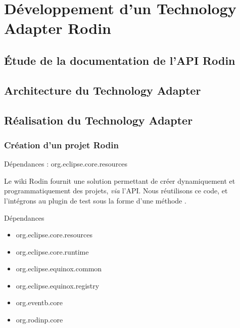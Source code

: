 \section{Développement d'un Technology Adapter Rodin}

\subsection{Étude de la documentation de l'API Rodin}

\subsection{Architecture du Technology Adapter}

\subsection{Réalisation du Technology Adapter}

\subsubsection{Création d'un projet Rodin}

Dépendances : org.eclipse.core.resources

Le wiki Rodin fournit une solution permettant de créer dynamiquement et programmatiquement des projets, \textit{via} l'API.
Nous réutilisons ce code, et l'intégrons au plugin de test sous la forme d'une méthode .



Dépendances

\begin{itemize}
    \item org.eclipse.core.resources
    \item org.eclipse.core.runtime
    \item org.eclipse.equinox.common
    \item org.eclipse.equinox.registry
    \item org.eventb.core
    \item org.rodinp.core
\end{itemize}
